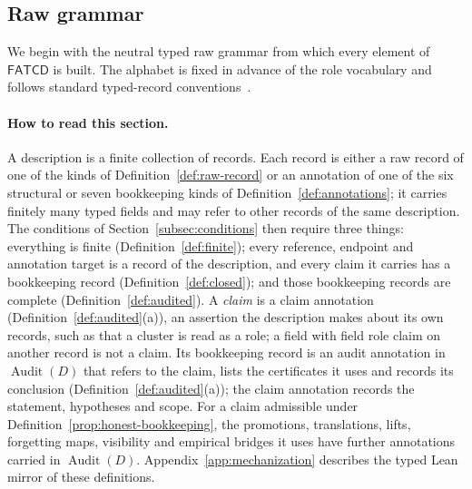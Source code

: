 \documentclass[11pt]{article}
\theoremstyle{definition}
\newcommand{\FATCD}{\ensuremath{\mathsf{FATCD}}}
\newcommand{\Audit}[1]{\ensuremath{\operatorname{Audit}\!\left(#1\right)}}
\begin{document}
\subsection{Raw grammar}\label{subsec:raw-grammar}

We begin with the neutral typed raw grammar from which every element
of \FATCD{} is built. The alphabet is fixed in advance of the role
vocabulary and follows standard typed-record
conventions~\citep{CardelliMitchell1991}.

\paragraph{How to read this section.} A description is a finite collection of
records. Each record is either a raw record of one of the kinds of
Definition~\ref{def:raw-record} or an annotation of one of the six structural or seven bookkeeping kinds
of Definition~\ref{def:annotations}; it carries finitely many typed fields
and may refer to other records of the same description. The conditions
of Section~\ref{subsec:conditions} then require three things: everything
is finite (Definition~\ref{def:finite}); every reference, endpoint and
annotation target is a record of the description, and every claim it
carries has a bookkeeping record (Definition~\ref{def:closed}); and those
bookkeeping records are complete (Definition~\ref{def:audited}). A
\emph{claim} is a claim annotation (Definition~\ref{def:audited}(a)), an assertion the description makes about its own
records, such as that a cluster is read as a role; a field with field role claim on another record is not a claim. Its bookkeeping record
is an audit annotation in \(\Audit{D}\) that refers to the claim, lists
the certificates it uses and records its conclusion
(Definition~\ref{def:audited}(a)); the claim annotation records the
statement, hypotheses and scope. For a claim admissible under
Definition~\ref{prop:honest-bookkeeping}, the promotions, translations,
lifts, forgetting maps, visibility and empirical bridges it uses have further
annotations carried in \(\Audit{D}\). Appendix~\ref{app:mechanization}
describes the typed Lean mirror of these definitions.
\end{document}
